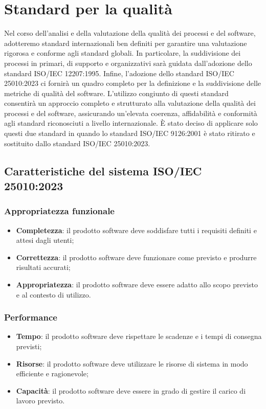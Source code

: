 \section{Standard per la qualità}
Nel corso dell’analisi e della valutazione della qualità dei processi e del software, adotteremo standard internazionali ben definiti per garantire una valutazione rigorosa e conforme agli standard globali. In particolare, la suddivisione dei processi in primari, di supporto e organizzativi sarà guidata dall’adozione dello standard ISO/IEC 12207:1995. Infine, l’adozione dello standard ISO/IEC 25010:2023 ci fornirà un quadro completo per la definizione e la suddivisione delle metriche di qualità del software. L’utilizzo congiunto di questi standard consentirà un approccio completo e strutturato alla valutazione della qualità dei processi e del software, assicurando un’elevata coerenza, affidabilità e conformità agli standard riconosciuti a livello internazionale. È stato deciso di applicare solo questi due standard in quando lo standard ISO/IEC 9126:2001 è stato ritirato e sostituito dallo standard ISO/IEC 25010:2023.
\subsection{Caratteristiche del sistema ISO/IEC 25010:2023}
\subsubsection{Appropriatezza funzionale}
\begin{itemize}
    \item \textbf{Completezza}: il prodotto software deve soddisfare tutti i requisiti definiti e attesi dagli utenti;
    \item \textbf{Correttezza}: il prodotto software deve funzionare come previsto e produrre risultati accurati;
    \item \textbf{Appropriatezza}: il prodotto software deve essere adatto allo scopo previsto e al contesto di utilizzo.
\end{itemize}
\subsubsection{Performance}
\begin{itemize}
    \item \textbf{Tempo}: il prodotto software deve rispettare le scadenze e i tempi di consegna previsti;
    \item \textbf{Risorse}: il prodotto software deve utilizzare le risorse di sistema in modo efficiente e ragionevole;
    \item \textbf{Capacità}: il prodotto software deve essere in grado di gestire il carico di lavoro previsto.
\end{itemize}
